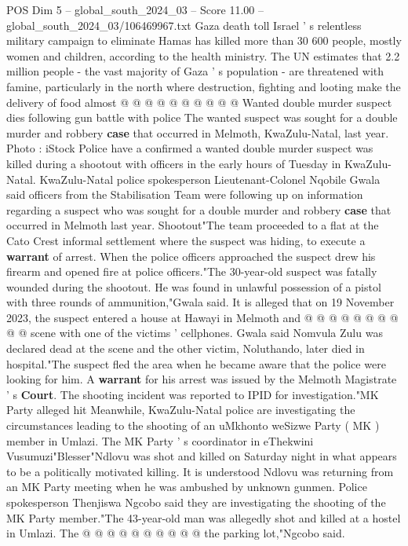 \begin{textsample}{POS Dim 5 – global\_south\_2024\_03 – Score 11.00 – global\_south\_2024\_03/106469967.txt}
Gaza death toll Israel ' s relentless military campaign to eliminate Hamas has killed more than 30 600 people, mostly women and children, according to the health ministry.
The UN estimates that 2.2 million people - the vast majority of Gaza ' s population - are threatened with famine, particularly in the north where destruction, fighting and looting make the delivery of food almost @ @ @ @ @ @ @ @ @ @ Wanted double murder suspect dies following gun battle with police The wanted suspect was sought for a double murder and robbery \textbf{case} that occurred in Melmoth, KwaZulu-Natal, last year.
Photo : iStock Police have a confirmed a wanted double murder suspect was killed during a shootout with officers in the early hours of Tuesday in KwaZulu-Natal.
KwaZulu-Natal police spokesperson Lieutenant-Colonel Nqobile Gwala said officers from the Stabilisation Team were following up on information regarding a suspect who was sought for a double murder and robbery \textbf{case} that occurred in Melmoth last year.
Shootout"The team proceeded to a flat at the Cato Crest informal settlement where the suspect was hiding, to execute a \textbf{warrant} of arrest.
When the police officers approached the suspect drew his firearm and opened fire at police officers."The 30-year-old suspect was fatally wounded during the shootout.
He was found in unlawful possession of a pistol with three rounds of ammunition,"Gwala said.
It is alleged that on 19 November 2023, the suspect entered a house at Hawayi in Melmoth and @ @ @ @ @ @ @ @ @ @ scene with one of the victims ' cellphones.
Gwala said Nomvula Zulu was declared dead at the scene and the other victim, Noluthando, later died in hospital."The suspect fled the area when he became aware that the police were looking for him.
A \textbf{warrant} for his arrest was issued by the Melmoth Magistrate ' s \textbf{Court}.
The shooting incident was reported to IPID for investigation."MK Party alleged hit Meanwhile, KwaZulu-Natal police are investigating the circumstances leading to the shooting of an uMkhonto weSizwe Party ( MK ) member in Umlazi.
The MK Party ' s coordinator in eThekwini Vusumuzi"Blesser"Ndlovu was shot and killed on Saturday night in what appears to be a politically motivated killing.
It is understood Ndlovu was returning from an MK Party meeting when he was ambushed by unknown gunmen.
Police spokesperson Thenjiswa Ngcobo said they are investigating the shooting of the MK Party member."The 43-year-old man was allegedly shot and killed at a hostel in Umlazi.
The @ @ @ @ @ @ @ @ @ @ the parking lot,"Ngcobo said.

\end{textsample}
